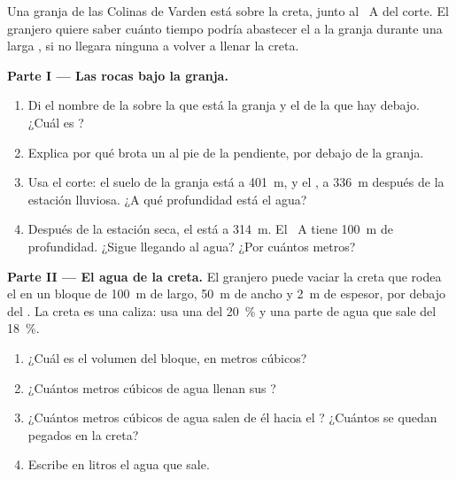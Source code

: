 \begin{problem}
\label{pb:g6:water-underground:1}
Una granja de las Colinas de Varden está sobre la creta, junto al ~A
del corte. El granjero quiere saber cuánto tiempo podría abastecer el 
a la granja durante una larga , si no llegara ninguna  a
volver a llenar la creta.

\medskip
\noindent\textbf{Parte I --- Las rocas bajo la granja.}
\begin{enumerate}
  \item Di el nombre de la  sobre la que está la granja y el de la 
        que hay debajo. ¿Cuál es ?
  \item Explica por qué brota un  al pie de la pendiente, por
        debajo de la granja.
  \item Usa el corte: el suelo de la granja está a 401~m, y el , a 336~m después de la estación lluviosa. ¿A qué
        profundidad está el agua?
  \item Después de la estación seca, el  está a 314~m. El
        ~A tiene 100~m de profundidad. ¿Sigue llegando al agua? ¿Por
        cuántos metros?
\end{enumerate}

\medskip
\noindent\textbf{Parte II --- El agua de la creta.}
El granjero puede vaciar la creta que rodea el  en un bloque de 100~m
de largo, 50~m de ancho y 2~m de espesor, por debajo del . La
creta es una caliza: usa una  del 20~\% y una parte de agua que
sale del 18~\%.
\begin{enumerate}[resume]
  \item ¿Cuál es el volumen del bloque, en metros cúbicos?
  \item ¿Cuántos metros cúbicos de agua llenan sus ?
  \item ¿Cuántos metros cúbicos de agua salen de él hacia el ? ¿Cuántos
        se quedan pegados en la creta?
  \item Escribe en litros el agua que sale.
\end{enumerate}


\end{problem}
